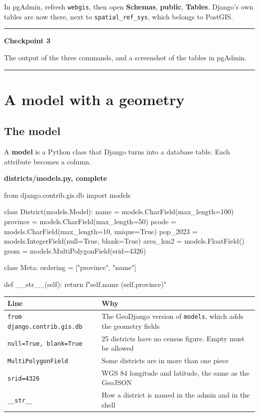 \documentclass{article}
\newcommand{\cd}[1]{\texttt{#1}}
\newcommand{\codecap}[1]{%
  \par\vspace{.9em}\noindent\textbf{#1}\par\vspace{-.6em}}
\newenvironment{keypoint}[1]
  {\par\vspace{.7em}\noindent\rule{\linewidth}{.6pt}\par\vspace{.15em}
   \noindent\textbf{#1}\par\nobreak\vspace{-.3em}}
  {\par\vspace{.15em}\noindent\rule{\linewidth}{.6pt}\par\vspace{.7em}}
\begin{document}
\vspace{.8em}
In pgAdmin, refresh \cd{webgis}, then open \textbf{Schemas},
\textbf{public}, \textbf{Tables}. Django's own tables are now there,
next to \cd{spatial\_ref\_sys}, which belongs to PostGIS.

\begin{keypoint}{Checkpoint 3}
The output of the three commands, and a screenshot of the tables in
pgAdmin.
\end{keypoint}


\section{A model with a geometry}

\subsection{The model}

A \textbf{model} is a Python class that Django turns into a database
table. Each attribute becomes a column.

\codecap{districts/models.py, complete}
\begin{code}
from django.contrib.gis.db import models


class District(models.Model):
    name = models.CharField(max_length=100)
    province = models.CharField(max_length=50)
    pcode = models.CharField(max_length=10, unique=True)
    pop_2023 = models.IntegerField(null=True, blank=True)
    area_km2 = models.FloatField()
    geom = models.MultiPolygonField(srid=4326)

    class Meta:
        ordering = ["province", "name"]

    def __str__(self):
        return f"{self.name} ({self.province})"
\end{code}

\begin{tabularx}{\textwidth}{@{}L{4.4cm} X@{}}
\toprule
\textbf{Line} & \textbf{Why} \\
\midrule
\cd{from django.contrib.gis.db} & The GeoDjango version of \cd{models},
                                  which adds the geometry fields \\
\cd{null=True, blank=True}      & 25 districts have no census figure.
                                  Empty must be allowed \\
\cd{MultiPolygonField}          & Some districts are in more than one
                                  piece \\
\cd{srid=4326}                  & WGS 84 longitude and latitude, the same
                                  as the GeoJSON \\
\cd{\_\_str\_\_}                & How a district is named in the admin and
                                  in the shell \\
\bottomrule
\end{tabularx}
\end{document}
